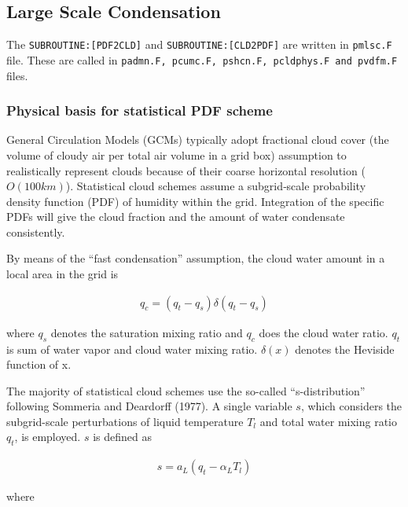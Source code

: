 \hypertarget{large-scale-condensation}{%
\subsection{Large Scale Condensation}\label{large-scale-condensation}}

The \texttt{SUBROUTINE:{[}PDF2CLD{]}} and
\texttt{SUBROUTINE:{[}CLD2PDF{]}} are written in \texttt{pmlsc.F} file.
These are called in
\texttt{padmn.F,\ pcumc.F,\ pshcn.F,\ pcldphys.F\ and\ pvdfm.F} files.

\hypertarget{physical-basis-for-statistical-pdf-scheme}{%
\subsubsection{Physical basis for statistical PDF
scheme}\label{physical-basis-for-statistical-pdf-scheme}}

General Circulation Models (GCMs) typically adopt fractional cloud cover
(the volume of cloudy air per total air volume in a grid box) assumption
to realistically represent clouds because of their coarse horizontal
resolution (\(O(100km)\)). Statistical cloud schemes assume a
subgrid‐scale probability density function (PDF) of humidity within the
grid. Integration of the specific PDFs will give the cloud fraction and
the amount of water condensate consistently.

By means of the ``fast condensation'' assumption, the cloud water amount
in a local area in the grid is

\begin{eqnarray}
q_{c}=\left(q_{t}-q_{s}\right) \delta\left(q_{t}-q_{s}\right)
\label{hpc.1}
\end{eqnarray}

where \(q_s\) denotes the saturation mixing ratio and \(q_c\) does the
cloud water ratio. \(q_t\) is sum of water vapor and cloud water mixing
ratio. \(\delta(x)\) denotes the Heviside function of x.

The majority of statistical cloud schemes use the so-called
``s-distribution'' following Sommeria and Deardorff (1977). A single
variable \(s\), which considers the subgrid-scale perturbations of
liquid temperature \(T_l\) and total water mixing ratio \(q_t\), is
employed. \(s\) is defined as

\begin{eqnarray}
s=a_{L}\left(q_{t}-\alpha_{L} T_{l}\right)
\end{eqnarray}

where

